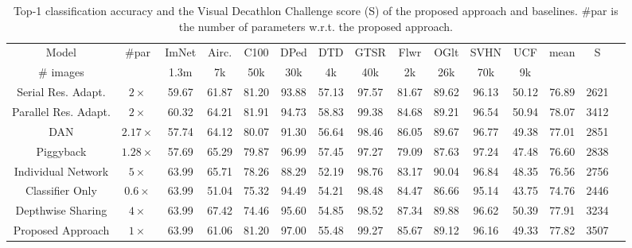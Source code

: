\documentclass[letterpaper]{article} \usepackage{aaai19}  \usepackage{times}  \usepackage{helvet}  \usepackage{courier}  \usepackage{url}  \usepackage{graphicx}  \usepackage{amssymb}
\begin{document}
\def\arraystretch{1.2}\begin{table*}[!htb]
	\small
	\begin{center}
		\begin{tabular}{c c c c c c c c c c c c c c c} 
			
		    Model	& \#par  & ImNet  & Airc. & C100  & DPed & DTD & GTSR & Flwr & OGlt & SVHN  &UCF  & mean & S \\
			
			\# images & & 1.3m & 7k &50k& 30k& 4k &40k& 2k &26k& 70k& 9k \\
			\hline
    
    		Serial Res. Adapt. &  $2 \times$  & 59.67 & 61.87 & 81.20  & 93.88&  57.13 & 97.57 & 81.67& 89.62 & 96.13 & 50.12  & 76.89 & 2621\\
    
    		Parallel Res. Adapt. & $2 \times$  &60.32& 64.21 &81.91 &94.73 &58.83 &99.38 &84.68& 89.21& 96.54& 50.94 & 78.07 & 3412\\
    		\hline
        	DAN & $2.17 \times$ & 57.74 &  64.12 & 80.07 & 91.30 & 56.64 & 98.46 & 86.05 & 89.67 & 96.77 & 49.38 & 77.01 & 2851  \\
            \hline
    
            Piggyback & $1.28 \times$ & 57.69 &65.29 & 79.87 & 96.99& 57.45 & 97.27 & 79.09 &87.63 & 97.24 & 47.48 & 76.60 & 2838  \\
            \hline		
    		Individual Network & $5 \times$ &  63.99&  65.71&  78.26& 88.29 & 52.19 & 98.76& 83.17 &90.04 & 96.84 & 48.35& 76.56 & 2756 \\

    		Classifier Only & $ 0.6 \times$ & 63.99& 51.04 & 75.32& 94.49 & 54.21& 98.48& 84.47 & 86.66 & 95.14 & 43.75 &74.76 & 2446  \\
    		
    		Depthwise Sharing & $4 \times$ & 63.99 & 67.42& 74.46 & 95.60& 54.85 & 98.52& 87.34 & 89.88 & 96.62 &50.39 & 77.91 &  3234 \\

    		Proposed Approach & $1\times$ & 63.99 & 61.06 & 81.20 & 97.00 & 55.48 & 99.27 & 85.67 & 89.12 & 96.16 & 49.33 & 77.82 & 3507 \\
			\hline 
		\end{tabular}
	\end{center}
		\caption{ {\textnormal{Top-1 classification accuracy and the Visual Decathlon Challenge score (S) of the proposed approach and baselines. \#par is the number of parameters w.r.t. the proposed approach.
}}}
	\label{table:results}
\end{table*}
\end{document}
